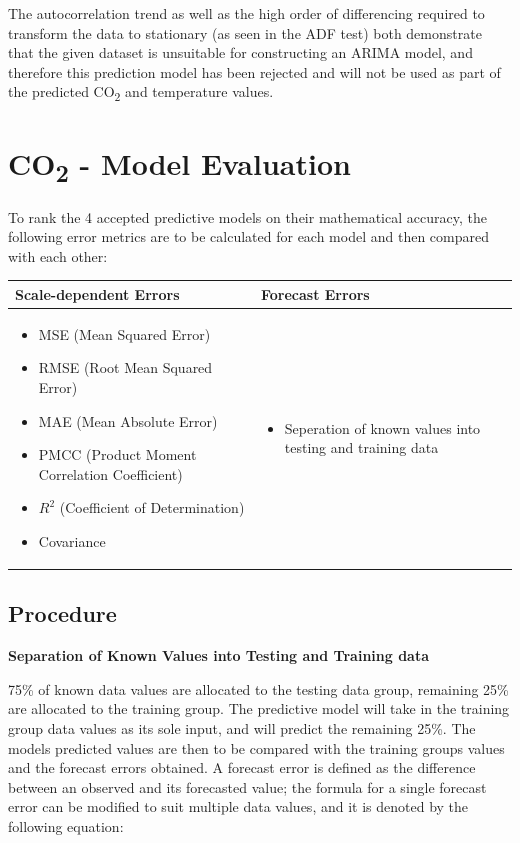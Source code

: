 \documentclass[12pt]{mcmthesis}
\begin{document}
    The autocorrelation trend as well as the high order of differencing required to transform the data to stationary (as seen in the ADF test) both demonstrate that the given dataset is unsuitable for constructing an ARIMA model, and therefore this prediction model has been rejected and will not be used as part of the predicted CO\textsubscript{2} and temperature values.



    \section{CO\textsubscript{2} - Model Evaluation}
    To rank the 4 accepted predictive models on their mathematical accuracy, the following error metrics are to be calculated for each model and then compared with each other:

    \begin{tabular}{|*2{p{}|}}
        \hline
        \textbf{Scale-dependent Errors} & \textbf{Forecast Errors} \\
        \hline
        \begin{itemize}[nosep]
            \item MSE (Mean Squared Error)
            \item RMSE (Root Mean Squared Error)
            \item MAE (Mean Absolute Error)
            \item PMCC (Product Moment Correlation Coefficient)
            \item ${R^2}$ (Coefficient of Determination)
            \item Covariance
        \end{itemize}
        &
        \begin{itemize}[nosep]
            \item Seperation of known values into testing and training data
        \end{itemize}
        \\
        \hline
    \end{tabular}

    \subsection{Procedure}
    \noindent \textbf{Separation of Known Values into Testing and Training data}

    75\% of known data values are allocated to the testing data group, remaining 25\% are allocated to the training group. The predictive model will take in the training group data values as its sole input, and will predict the remaining 25\%. The model\textquotesingle s predicted values are then to be compared with the training group\textquotesingle s values and the forecast errors obtained.
    A forecast error is defined as the difference between an observed and its forecasted value; the formula for a single forecast error can be modified to suit multiple data values, and it is denoted by the following equation:
\end{document}
